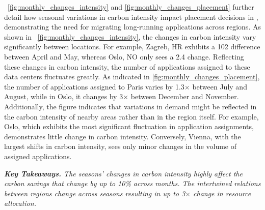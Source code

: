 ~\autoref{fig:monthly_changes_intensity} and \autoref{fig:monthly_changes_placement} further detail how seasonal variations in carbon intensity impact placement decisions in \proposedsystem, demonstrating the need for migrating long-running applications across regions. As shown in ~\autoref{fig:monthly_changes_intensity}, the changes in carbon intensity vary significantly between locations. For example, Zagreb, HR exhibits a 102 \carbonunit difference between April and May, whereas Oslo, NO only sees a 2.4 \carbonunit change. Reflecting these changes in carbon intensity, the number of applications assigned to these data centers fluctuates greatly. As indicated in \autoref{fig:monthly_changes_placement}, the number of applications assigned to Paris varies by 1.3$\times$ between July and August, while in Oslo, it changes by 3$\times$ between December and November. Additionally, the figure indicates that variations in demand  might be reflected in the carbon intensity of nearby areas rather than in the region itself. For example, Oslo, which exhibits the most significant fluctuation in application assignments, demonstrates little change in carbon intensity. Conversely, Vienna, with the largest shifts in carbon intensity, sees only minor changes in the volume of assigned applications.
 
 






\noindent \textit{\textbf{Key Takeaways.} 
The seasons' changes in carbon intensity highly affect the carbon savings that change by up to 10\% across months. The intertwined relations between regions change across seasons resulting in up to 3$\times$ change in resource allocation.
}




